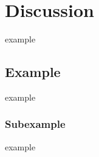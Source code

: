 \chapter{Discussion} \label{chap:discussion}

example

\section{Example}

example 


\subsection{Subexample}

example 

